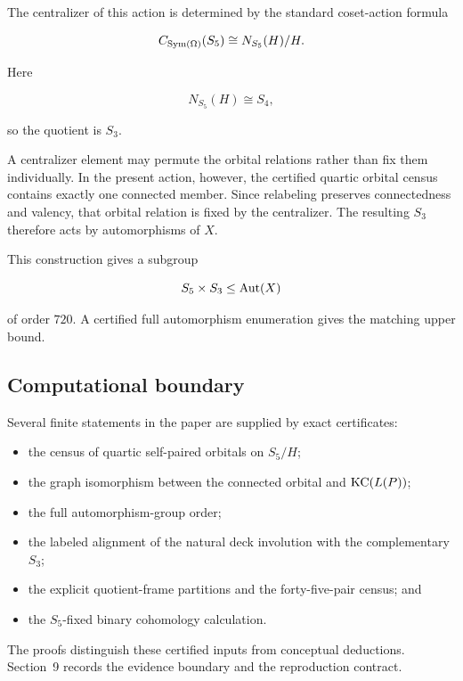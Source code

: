 The centralizer of this action is determined by the standard coset-action
formula

\[
C_{\operatorname{Sym}(\Omega)}(S_5)
\cong
N_{S_5}(H)/H.
\]

Here

\[
N_{S_5}(H)\cong S_4,
\]

so the quotient is \(S_3\).

A centralizer element may permute the orbital relations rather than fix
them individually. In the present action, however, the certified quartic
orbital census contains exactly one connected member. Since relabeling
preserves connectedness and valency, that orbital relation is fixed by the
centralizer. The resulting \(S_3\) therefore acts by automorphisms of
\(X\).

This construction gives a subgroup

\[
S_5\times S_3
\leq
\operatorname{Aut}(X)
\]

of order \(720\). A certified full automorphism enumeration gives the
matching upper bound.

\subsection{Computational boundary}

Several finite statements in the paper are supplied by exact
certificates:

\begin{itemize}

\item the census of quartic self-paired orbitals on \(S_5/H\);

\item the graph isomorphism between the connected orbital and
\(\operatorname{KC}(L(P))\);

\item the full automorphism-group order;

\item the labeled alignment of the natural deck involution with the
complementary \(S_3\);

\item the explicit quotient-frame partitions and the forty-five-pair
census; and

\item the \(S_5\)-fixed binary cohomology calculation.

\end{itemize}

The proofs distinguish these certified inputs from conceptual deductions.
Section~9 records the evidence boundary and the reproduction contract.


